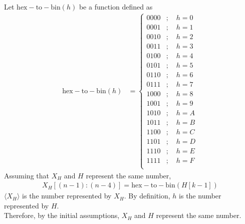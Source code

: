 \documentclass[fleqn, a4paper, 12pt, oneside]{amsart}
\theoremstyle{definition}
\theoremstyle{theorem}
\newcommand{\Not}{{\textsc{not}}}
\renewcommand{\And}{{\textsc{and}}}
\newcommand{\Or}{{\textsc{or}}}
\begin{document}
\begin{solution}
	\begin{tasks}
		\task
			Let $\mathrm{hex-to-bin}(h)$ be a function defined as
			\begin{align*}
				\mathrm{hex-to-bin}(h) &=
					\begin{cases}
						0000 &;\quad h = 0\\
						0001 &;\quad h = 1\\
						0010 &;\quad h = 2\\
						0011 &;\quad h = 3\\
						0100 &;\quad h = 4\\
						0101 &;\quad h = 5\\
						0110 &;\quad h = 6\\
						0111 &;\quad h = 7\\
						1000 &;\quad h = 8\\
						1001 &;\quad h = 9\\
						1010 &;\quad h = A\\
						1011 &;\quad h = B\\
						1100 &;\quad h = C\\
						1101 &;\quad h = D\\
						1110 &;\quad h = E\\
						1111 &;\quad h = F\\
					\end{cases}
			\end{align*}
			Assuming that $X_H$ and $H$ represent the same number,
			\begin{align*}
				X_H \left[ (n - 1) : (n - 4) \right] = \mathrm{hex-to-bin} \left( H[k - 1] \right)
			\end{align*}
		\task
			$\langle X_H \rangle$ is the number represented by $X_H$.
			By definition, $h$ is the number represented by $H$.\\
			Therefore, by the initial assumptions, $X_H$ and $H$ represent the same number.
	\end{tasks}
\end{solution}

\end{document}
